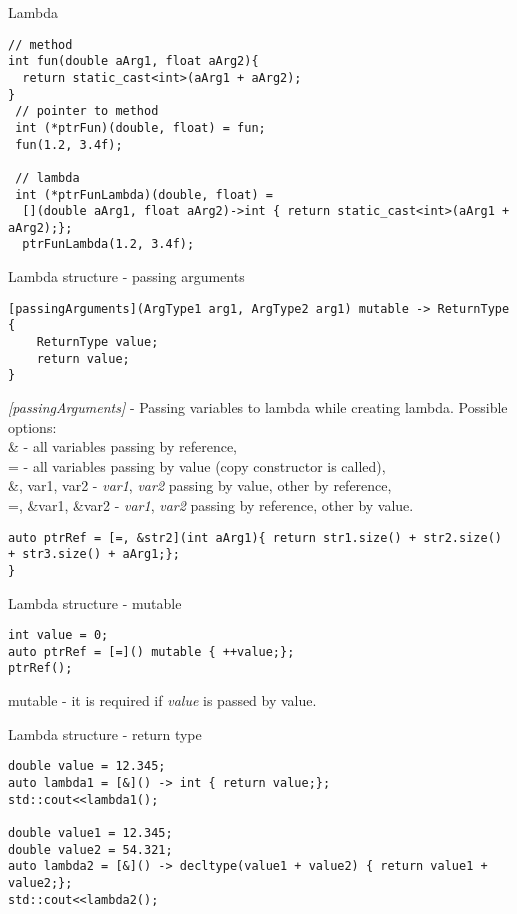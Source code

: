 \documentclass{beamer}
\begin{document}
\begin{frame}[fragile]{Lambda}
\begin{lstlisting}[style=customcpp]
// method
int fun(double aArg1, float aArg2){
  return static_cast<int>(aArg1 + aArg2);
}
 // pointer to method
 int (*ptrFun)(double, float) = fun;
 fun(1.2, 3.4f);
 
 // lambda
 int (*ptrFunLambda)(double, float) =
  [](double aArg1, float aArg2)->int { return static_cast<int>(aArg1 + aArg2);};
  ptrFunLambda(1.2, 3.4f);
\end{lstlisting}
\end{frame}


\begin{frame}[fragile]{Lambda structure - passing arguments}
\begin{lstlisting}[style=customcpp]
[passingArguments](ArgType1 arg1, ArgType2 arg1) mutable -> ReturnType { 
	ReturnType value;
	return value;
}
\end{lstlisting}
\textit{[passingArguments]} - Passing variables to lambda while creating lambda. Possible options: \\

\& - all variables passing by reference, \\
= - all variables passing by value (copy constructor is called),\\
\&, var1, var2 - \textit{var1}, \textit{var2} passing by value, other by reference,\\
=, \&var1, \&var2 - \textit{var1}, \textit{var2} passing by reference, other by value.\\
\begin{lstlisting}[style=customcpp]
auto ptrRef = [=, &str2](int aArg1){ return str1.size() + str2.size() + str3.size() + aArg1;};
}
\end{lstlisting}
\end{frame}

\begin{frame}[fragile]{Lambda structure -  mutable}
\begin{lstlisting}[style=customcpp]
int value = 0;
auto ptrRef = [=]() mutable { ++value;};
ptrRef();
\end{lstlisting}
mutable - it is required if \textit{value} is passed by value.
\end{frame}

\begin{frame}[fragile]{Lambda structure -  return type}
\begin{lstlisting}[style=customcpp]
double value = 12.345;
auto lambda1 = [&]() -> int { return value;};
std::cout<<lambda1();
	
double value1 = 12.345;
double value2 = 54.321;
auto lambda2 = [&]() -> decltype(value1 + value2) { return value1 + value2;};
std::cout<<lambda2();
\end{lstlisting}
\end{frame}
\end{document}
